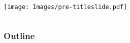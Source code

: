 
\ifnum{}
  \vspace{-0.1in}
  \begin{frame}
  \begin{columns}
  \texttt{[image: Images/pre-titleslide.pdf]}
  \end{columns}
  \end{frame}
\fi

\begin{frame}
\titlepage
\end{frame}


\begin{frame}\frametitle{Outline}
\tableofcontents
\end{frame}






